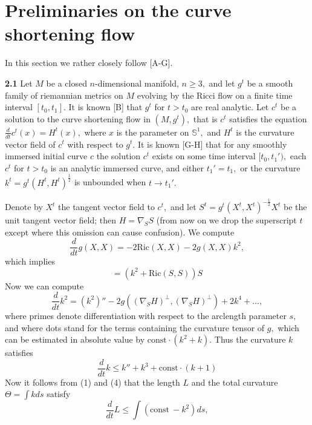 \documentclass{article}
\newcommand{\co}{\mathrm{const}}
\begin{document}
\section{Preliminaries on the curve shortening flow}
\par In this section we rather closely follow [A-G].
\par {\bf 2.1} Let $M$ be a closed $n$-dimensional manifold, $n\ge
3,$ and let $g^t$ be a smooth family of riemannian metrics on $M$
evolving by the Ricci flow on a finite time interval $[t_0,t_1].$
It is known [B] that $g^t$ for $t>t_0$ are real analytic. Let
$c^t$ be a solution to the curve shortening flow in $(M,g^t),$
that is $c^t$ satisfies the equation $\frac{d}{dt}c^t(x)=H^t(x),$
where $x$ is the parameter on $\mathbb{S}^1,$ and $H^t$ is the
curvature vector field of $c^t$ with respect to $g^t.$ It is known
[G-H] that for any smoothly immersed initial curve $c$ the
solution $c^t$ exists on some time interval $[t_0,t_1'),$ each
$c^t$ for $t>t_0$ is an analytic immersed curve, and either
$t_1'=t_1,$ or the curvature $k^t=g^t(H^t,H^t)^{\frac{1}{2}}$ is
unbounded when $t\to t_1'.$
\par Denote by $X^t$ the tangent vector field to $c^t,$ and let
$S^t=g^t(X^t,X^t)^{-\frac{1}{2}}X^t$ be the unit tangent vector
field; then $H=\nabla_S S$ (from now on we drop the superscript
$t$ except where this omission can cause confusion). We compute
\begin{equation}
\frac{d}{dt}g(X,X)=-2\mathrm{Ric}(X,X)-2g(X,X)k^2, \end{equation}
which implies \begin{equation} [H,S]=(k^2+\mathrm{Ric}(S,S))S
\end{equation} Now we can compute \begin{equation}
\frac{d}{dt}k^2=(k^2)''-2g((\nabla_S H)^{\perp},(\nabla_S
H)^{\perp})+2k^4 + ..., \end{equation} where primes denote
differentiation with respect to the arclength parameter $s,$ and
where dots stand for the terms containing the curvature tensor of
$g,$ which can be estimated in absolute value by
$\co\cdot(k^2+k).$ Thus the curvature $k$ satisfies
\begin{equation} \frac{d}{dt}k\le k''+k^3+\co\cdot(k+1)
\end{equation} Now it follows from (1) and (4) that the length $L$
and the total curvature $\Theta=\int kds$ satisfy \begin{equation}
\frac{d}{dt}L\le \int (\co \ -k^2)ds, \end{equation}
\end{document}
